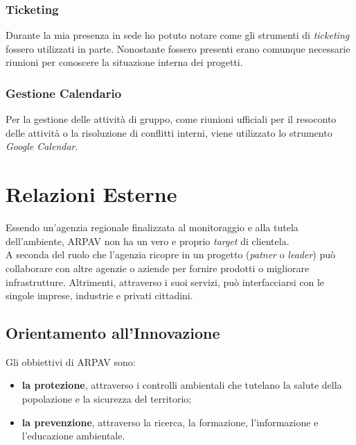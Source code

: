 \subsubsection{Ticketing}

Durante la mia presenza in sede ho potuto notare come gli strumenti di \textit{ticketing} fossero utilizzati in parte. Nonostante fossero presenti erano comunque necessarie riunioni per conoscere la situazione interna dei progetti.
\subsubsection{Gestione Calendario}

Per la gestione delle attività di gruppo, come riunioni ufficiali per il resoconto delle attività o la risoluzione di conflitti interni, viene utilizzato lo strumento \textit{Google Calendar}.




\section{Relazioni Esterne}


Essendo un'agenzia regionale finalizzata al monitoraggio e alla tutela dell'ambiente, ARPAV non ha un vero e proprio \textit{target} di clientela. \\
A seconda del ruolo che l'agenzia ricopre in un progetto (\textit{patner} o \textit{leader}) può collaborare con altre agenzie o aziende per fornire prodotti o migliorare infrastrutture. Altrimenti, attraverso i suoi servizi, può interfacciarsi con le singole imprese, industrie e  privati cittadini. 

\subsection{Orientamento all'Innovazione}
Gli obbiettivi di ARPAV sono:
\begin{itemize}
	
\item    \textbf{la protezione}, attraverso i controlli ambientali che tutelano la salute della popolazione e la sicurezza del territorio;
\item \textbf{la prevenzione}, attraverso la ricerca, la formazione, l'informazione e l'educazione ambientale.
\end{itemize} 

